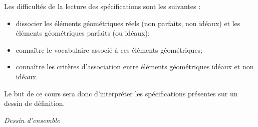 \documentclass[11pt,oneside]{article}
\begin{document}
Les difficultés de la lecture des spécifications sont les suivantes :
\begin{itemize}
\item dissocier les éléments géométriques réels (non parfaits, non idéaux) et les éléments géométriques parfaits (ou idéaux);
\item connaître le vocabulaire associé à ces éléments géométriques;
\item connaître les critères d'association entre éléments géométriques idéaux et non idéaux. 
\end{itemize}

Le but de ce cours sera donc d'interpréter les spécifications présentes sur un dessin de définition. 
\begin{minipage}[c]{.46\linewidth}
\begin{center}

\textit{Dessin d'ensemble}
\end{center}
\end{minipage}\hfill
\end{document}
